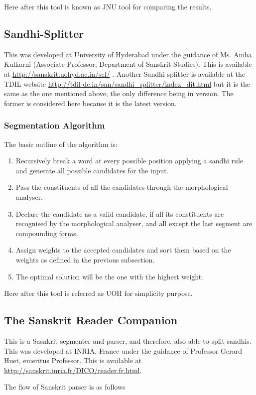 \documentclass[11pt]{article}
\begin{document}
Here after this tool is known as JNU tool for comparing the results.
\subsection{Sandhi-Splitter} This was developed at University of Hyderabad under the guidance of Ms. Amba Kulkarni (Associate Professor, Department of Sanskrit Studies). This is available at \url{http://sanskrit.uohyd.ac.in/scl/}  . 
Another Sandhi splitter is available at the TDIL website 
\url{http://tdil-dc.in/san/sandhi_splitter/index_dit.html}  but it is the same as the one mentioned above, the only difference being in version. The former is considered here because it is the latest version.

\subsubsection{Segmentation Algorithm}
The basic outline of the algorithm is\cite{Kumar2010}:
\begin{enumerate}
	\item Recursively break a word at every possible position applying a sandhi rule and generate all possible candidates for the input.
	\item Pass the constituents of all the candidates through the morphological analyser.
	\item Declare the candidate as a valid candidate, if all its constituents are recognised by the morphological analyser, and all except the last segment are compounding forms.
	\item Assign weights to the accepted candidates and sort them based on the weights as defined in the previous subsection.
	\item The optimal solution will be the one with the highest weight.
\end{enumerate}

Here after this tool is referred as UOH for simplicity purpose.

\subsection{The Sanskrit Reader Companion } This is a Sasnkrit segmenter and parser, and therefore, also able to split sandhis. This was developed at INRIA, France under the guidance of Professor Gerard Huet, emeritus Professor. This is available at \url{http://sanskrit.inria.fr/DICO/reader.fr.html}.

 The flow of Sanskrit parser is as follows
\end{document}
